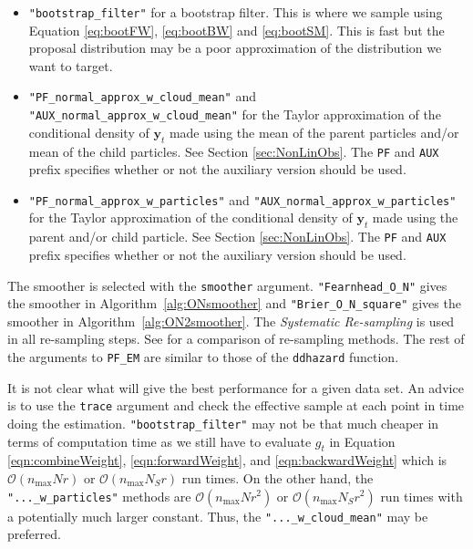 \documentclass[notitlepage]{article}
\renewcommand{\vec}[1]{\bm{#1}}
\newcommand{\Lparen}[1]{\left( #1\right)}
\newcommand{\bigO}[1]{\mathcal{O}\Lparen{#1}}
\newcommand{\dimRng}{r}
\newcommand{\nPart}{N}
\newcommand{\nMax}{n_{\text{max}}}
\begin{document}
\begin{itemize}
	\item \texttt{"bootstrap\_filter"} for a bootstrap filter. This is where we sample using 
	Equation \eqref{eq:bootFW}, \eqref{eq:bootBW} and \eqref{eq:bootSM}. This is fast but the proposal 
	distribution may be a poor approximation of the distribution we want to target.
	\item \texttt{"PF\_normal\_approx\_w\_cloud\_mean"} and \texttt{"AUX\_normal\_approx\_w\_cloud\_mean"} for 
	the Taylor approximation of the conditional density of $\vec{y}_t$ made using the mean of the parent 
	particles and/or mean of the child particles. See Section \ref{sec:NonLinObs}. 
	The \texttt{PF} and \texttt{AUX} prefix specifies whether or not the auxiliary version 
	should be used.
	\item \texttt{"PF\_normal\_approx\_w\_particles"} and 
	 \texttt{"AUX\_normal\_approx\_w\_particles"} for the Taylor approximation of the conditional density 
	 of $\vec{y}_t$ made using the parent and/or child particle. 
	  See Section \ref{sec:NonLinObs}.
	  The \texttt{PF} and \texttt{AUX} prefix specifies whether or not the auxiliary version should be used.
\end{itemize}

The smoother is selected with the \texttt{smoother} argument. \texttt{"Fearnhead\_O\_N"} gives the smoother in Algorithm~\ref{alg:ONsmoother} and \texttt{"Brier\_O\_N\_square"} gives the smoother in Algorithm~\ref{alg:ON2smoother}. 
The \emph{Systematic Re-sampling} \citep{kitagawa96} is used in all re-sampling steps. See \cite{douc05} for a 
comparison of re-sampling methods. The rest of the arguments to \texttt{PF\_EM} are similar to those of the 
\texttt{ddhazard} function.

It is not clear what will give the best performance for a given data set. An advice is to use the \texttt{trace}
argument and check the effective sample at each point in time doing the estimation. \texttt{"bootstrap\_filter"}
may not be that much cheaper in terms of computation time as we still have to evaluate $g_t$ in Equation
\eqref{eqn:combineWeight}, \eqref{eqn:forwardWeight}, and \eqref{eqn:backwardWeight} which is 
$\bigO{\nMax\nPart\dimRng}$ or $\bigO{\nMax\nPart_S\dimRng}$ run times. 
On the other hand, the \texttt{"...\_w\_particles"}
methods are $\bigO{\nMax\nPart\dimRng^2}$ or $\bigO{\nMax\nPart_S\dimRng^2}$ run times
with a potentially much larger constant. 
Thus, the \texttt{"...\_w\_cloud\_mean"} may be preferred.
\end{document}
